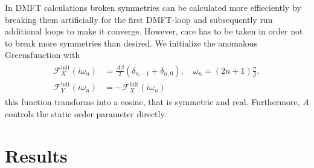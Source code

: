 \documentclass[aps,prb,twocolumn,groupedaddress,amsmath,amssymb]{revtex4-1}
\newcommand{\nambu}[1]{\mathcal{#1}}
\begin{document}
In DMFT calculations broken symmetries can be calculated more effieciently by breaking them artificially for the first DMFT-loop and subsequently run additional loops to make it converge. However, care has to be taken in order not to break more symmetries than desired. We initialize the anomalous Greensfunction with
\begin{align}
  \label{eq:anomiwinit}
  \begin{split}
    \nambu{F}_X^{\mathrm{init}}(i\omega_n) &= \frac{A\beta}{2}\left( \delta_{n,-1} + \delta_{n, 0}\right),\quad \omega_n = \left(2n+1\right)\frac{\pi}{\beta},\\
    \nambu{F}_Y^{\mathrm{init}}(i\omega_n) &= -\nambu{F}_X^{\mathrm{init}}(i\omega_n)
  \end{split}
\end{align}
this function transforms into a cosine, that is symmetric and real. Furthermore, $A$ controls the static order parameter directly.

\section{Results}
\end{document}
